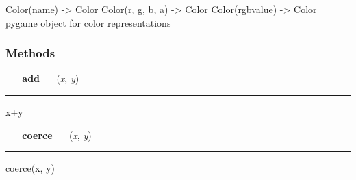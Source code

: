Color(name) -{\textgreater} Color Color(r, g, b, a) -{\textgreater} Color 
Color(rgbvalue) -{\textgreater} Color pygame object for color 
representations



  \subsubsection{Methods}

    \label{pygame:Color:__add__}

    \vspace{0.5ex}

\hspace{.8\funcindent}\begin{boxedminipage}{\funcwidth}

    \raggedright \textbf{\_\_add\_\_}(\textit{x}, \textit{y})

    \vspace{-1.5ex}

    \rule{\textwidth}{0.5\fboxrule}
\setlength{\parskip}{2ex}
    x+y

\setlength{\parskip}{1ex}
    \end{boxedminipage}

    \label{pygame:Color:__coerce__}

    \vspace{0.5ex}

\hspace{.8\funcindent}\begin{boxedminipage}{\funcwidth}

    \raggedright \textbf{\_\_coerce\_\_}(\textit{x}, \textit{y})

    \vspace{-1.5ex}

    \rule{\textwidth}{0.5\fboxrule}
\setlength{\parskip}{2ex}
    coerce(x, y)

\setlength{\parskip}{1ex}
    \end{boxedminipage}

    \label{pygame:Color:__delitem__}

    \vspace{0.5ex}

